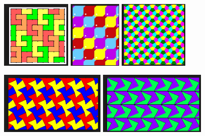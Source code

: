 \documentclass[12pt, reqno]{amsart}
\theoremstyle{remark}
\theoremstyle{definition}
\numberwithin{equation}{section}  %
\begin{document}
\begin{center}
\includegraphics[height=3.25cm]{tessellate2}
\qquad
\includegraphics[height=3.25cm]{tessellate5}
\qquad
\includegraphics[height=3.25cm]{tessellate6}

\bigskip

\includegraphics[height=3cm]{tessellate3}
\qquad\qquad
\includegraphics[height=3cm]{tessellate7}

\end{center}

\newpage 
\end{document}
